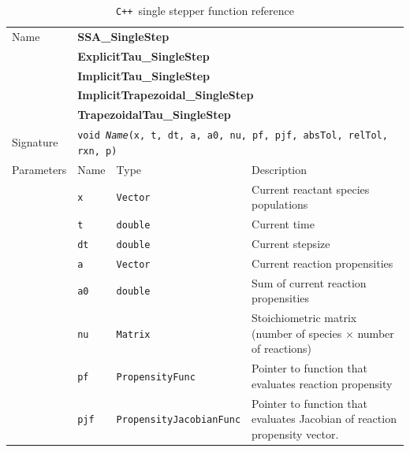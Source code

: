 \documentclass[12pt]{article}
\newcommand{\cpp}{\texttt{C++}}%
\newcommand{\srccode}[1]{\texttt{#1}}
\begin{document}
\begin{table}%
  \begin{center}
    \caption{\cpp\ single stepper function reference} \label{cpp_singlestep_tab}
    \begin{tabular}{|p{0.75in}|p{0.5in}|p{1.125in}|p{2.625in}|}
      \hline
      Name  & \multicolumn{3}{p{4.5in}|}{\textbf{SSA\_SingleStep}} \\
            & \multicolumn{3}{p{4.5in}|}{\textbf{ExplicitTau\_SingleStep}} \\
            & \multicolumn{3}{p{4.5in}|}{\textbf{ImplicitTau\_SingleStep}} \\
            & \multicolumn{3}{p{4.5in}|}{\textbf{ImplicitTrapezoidal\_SingleStep}} \\
        & \multicolumn{3}{p{4.5in}|}{\textbf{TrapezoidalTau\_SingleStep}} \\
      \hline
      Signature & \multicolumn{3}{l|}{
          \srccode{void \emph{Name}(x, t, dt, a, a0, nu, pf, pjf, absTol, relTol, rxn,
                         p)}} \\
      \hline
      Parameters &  Name & Type & Description \\
      \cline{2-4}
                 &  \srccode{x} & \srccode{Vector} &
                       Current reactant species populations \\
                 &  \srccode{t} & \srccode{double} &
                       Current time \\
                 &  \srccode{dt} & \srccode{double} &
                       Current stepsize \\
                 &  \srccode{a} & \srccode{Vector} &
                       Current reaction propensities \\
                 &  \srccode{a0} & \srccode{double} &
                       Sum of current reaction propensities \\
                 &  \srccode{nu} & \srccode{Matrix} &
                       Stoichiometric matrix (number of species $\times$
                       number of reactions) \\
                 &  \srccode{pf} & \srccode{Propensity\-Func} &
                       Pointer to function that evaluates reaction propensity \\
                 &  \srccode{pjf} & \srccode{Propensity\-Jacobian\-Func} &
                       Pointer to function that evaluates Jacobian of reaction
                       propensity vector. \\

\end{tabular}
\end{center}
\end{table}
\end{document}

